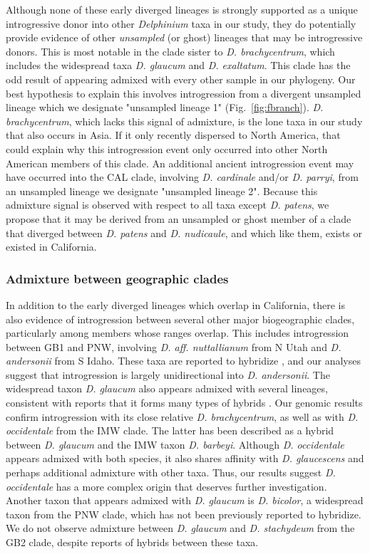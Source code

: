 \documentclass[11pt]{article}
\begin{document}
Although none of these early diverged lineages is strongly supported as a unique introgressive donor into other \emph{Delphinium} taxa in our study, they do potentially provide evidence of other \emph{unsampled} (or ghost) lineages that may be introgressive donors.
This is most notable in the clade sister to \emph{D. brachycentrum}, which includes 
the widespread taxa \emph{D. glaucum} and \emph{D. exaltatum}. 
This clade has the odd result of appearing admixed with every other sample in our 
phylogeny.
Our best hypothesis to explain this involves introgression from a divergent unsampled
lineage which we designate "unsampled lineage 1" (Fig.~\ref{fig:fbranch}). 
% 
\emph{D. brachycentrum}, which lacks this signal of admixture, is the lone taxa in our
study that also occurs in Asia. If it only recently dispersed to North America, that 
could explain why this introgression event only occurred into other North American 
members of this clade.
% 
An additional ancient introgression event may have occurred into the CAL clade, 
involving \emph{D. cardinale} and/or \emph{D. parryi}, from an unsampled lineage we 
designate "unsampled lineage 2". Because this admixture signal is observed with respect to all taxa except \emph{D. patens}, we propose that it may be derived from an unsampled or ghost member of a clade that diverged between \emph{D. patens} and \emph{D. nudicaule}, and which like them, exists or existed in California. 


\subsubsection{Admixture between geographic clades}
% 
In addition to the early diverged lineages which overlap in California, there is
also evidence of introgression between several other major biogeographic
clades, particularly among members whose ranges overlap.
% 
This includes introgression between GB1 and PNW, involving \emph{D. aff. nuttallianum}
from N Utah and \emph{D. andersonii} from S Idaho. These taxa are reported to 
hybridize \citep{hickman1993jepson}, and our analyses suggest that introgression is largely unidirectional into \emph{D. andersonii}.
% 
The widespread taxon \emph{D. glaucum} also appears admixed with several lineages, 
consistent with reports that it forms many types of hybrids \citep{warnock_taxonomic_1995}.
Our genomic results confirm introgression with its close relative \emph{D. brachycentrum}, 
as well as with \emph{D. occidentale} from the IMW clade. 
The latter has been described as a hybrid between \emph{D. glaucum} and the 
IMW taxon \emph{D. barbeyi}. Although \emph{D. occidentale} appears admixed with both
species, it also shares affinity with \emph{D. glaucescens} and perhaps additional 
admixture with other taxa. Thus, our results suggest \emph{D. occidentale} has a more 
complex origin that deserves further investigation.
% 
Another taxon that appears admixed with \emph{D. glaucum} is \emph{D. bicolor},
a widespread taxon from the PNW clade, which has not been previously 
reported to hybridize. 
We do not observe admixture between \emph{D. glaucum} and \emph{D. stachydeum} 
from the GB2 clade, despite reports of hybrids between these taxa.
% 
\end{document}

